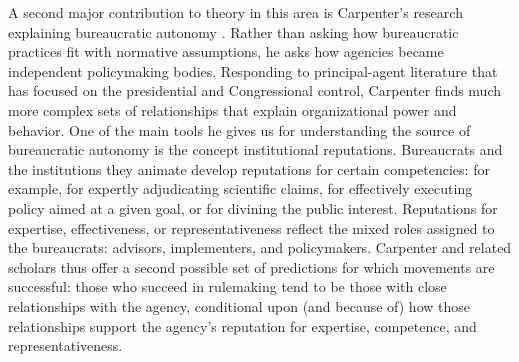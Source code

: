 A second major contribution to theory in this area is Carpenter's  research explaining bureaucratic autonomy \citep{Carpenter2001,Carpenter2012}. Rather than asking how bureaucratic practices fit with normative assumptions, he asks how agencies became independent policymaking bodies. Responding to principal-agent literature that has focused on the presidential and Congressional control, Carpenter finds much more complex sets of relationships that explain organizational power and behavior. One of the main tools he gives us for understanding the source of bureaucratic autonomy is the concept institutional reputations. Bureaucrats and the institutions they animate develop reputations for certain competencies: for example, for expertly adjudicating scientific claims, for effectively executing policy aimed at a given goal, or for divining the public interest. Reputations for expertise, effectiveness, or representativeness reflect the mixed roles assigned to the bureaucrats: advisors, implementers, and policymakers. 
Carpenter and related scholars thus offer a second possible set of predictions for which movements are successful: those who succeed in rulemaking tend to be those with close relationships with the agency, conditional upon (and because of) how those relationships support the agency's reputation for expertise, competence, and representativeness. %

